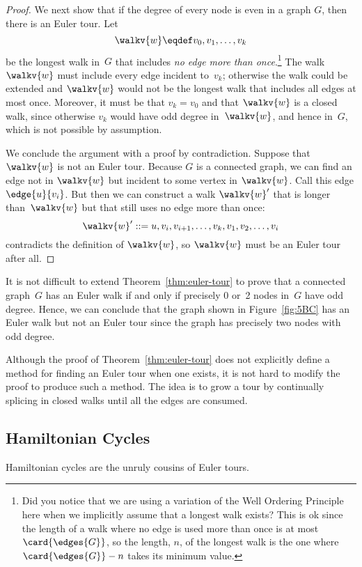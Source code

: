 \begin{editingnotes}
\begin{proof}
We next show that if the degree of every node is even in a graph
$G$, then there is an Euler tour.  Let
\[
\walkv{w} \eqdef v_0, v_1, \dots, v_k
\]
be the longest walk in~$G$ that includes \emph{no edge more than
  once}.\footnote{Did you notice that we are using a variation of the
  Well Ordering Principle here when we implicitly assume that a
  longest walk exists?  This is ok since the length of a walk where no
  edge is used more than once is at most~$\card{\edges{G}}$, so the
  length, $n$, of the longest walk is the one where $\card{\edges{G}}
  - n$ takes its minimum value.}  The walk $\walkv{w}$ must include
every edge incident to~$v_k$; otherwise the walk could be extended and
$\walkv{w}$ would not be the longest walk that includes all edges at
most once.  Moreover, it must be that $v_k = v_0$ and that
$\walkv{w}$ is a closed walk, since otherwise $v_k$ would have odd
degree in~$\walkv{w}$, and hence in~$G$, which is not possible by
assumption.

We conclude the argument with a proof by contradiction.  Suppose that
$\walkv{w}$ is not an Euler tour.  Because $G$ is a connected graph,
we can find an edge not in $\walkv{w}$ but incident to some vertex in
$\walkv{w}$.  Call this edge $\edge{u}{v_i}$.  But then we can
construct a walk $\walkv{w}'$ that is longer than~$\walkv{w}$ but
that still uses no edge more than once:
\[
   \walkv{w}' ::= u, v_i, v_{i + 1}, \dots, v_k, v_1, v_2, \dots, v_i
\]
contradicts the definition of $\walkv{w}$, so $\walkv{w}$ must be an
Euler tour after all.
\end{proof}

It is not difficult to extend Theorem~\ref{thm:euler-tour} to prove that a
connected graph~$G$ has an Euler walk if and only if precisely 0 or~2
nodes in~$G$ have odd degree.  Hence, we can conclude that the graph
shown in Figure~\ref{fig:5BC} has an Euler walk but not an Euler tour
since the graph has precisely two nodes with odd degree.

Although the proof of Theorem~\ref{thm:euler-tour} does not explicitly
define a method for finding an Euler tour when one exists, it is not
hard to modify the proof to produce such a method.  The idea is to
grow a tour by continually splicing in closed walks until all the
edges are consumed.

\subsection{Hamiltonian Cycles}

Hamiltonian cycles are the unruly cousins of Euler tours.


\end{editingnotes}
